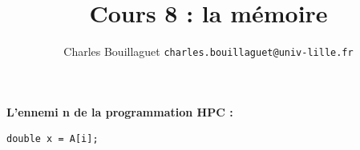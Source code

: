 \documentclass[xcolor={x11names,svgnames}]{beamer}
\author[C.~Bouillaguet]{Charles Bouillaguet \newline
  {\small \texttt{charles.bouillaguet@univ-lille.fr}}}
\title{Cours 8 : la mémoire}
\begin{document}
\begin{frame}[label=title]
    \titlepage
  \end{frame}
  

\begin{frame}[label=golden_rule,fragile]

  \centering
  
    \huge \bf {L'ennemi n de la programmation HPC :}

  \vspace{2cm}\pause
\begin{center}
\begin{verbatim}
double x = A[i];
\end{verbatim}
\end{center}
\end{frame}
\end{document}
